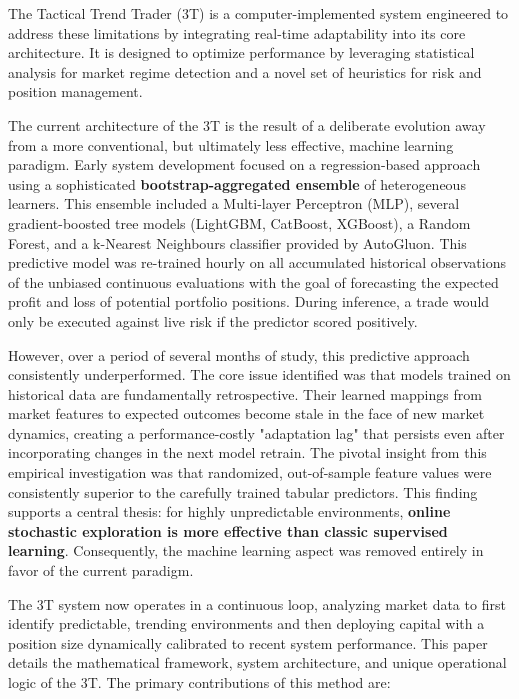 \documentclass[10pt]{article}
\begin{document}
The Tactical Trend Trader (3T) is a computer-implemented system engineered to address these limitations by integrating real-time adaptability into its core architecture. It is designed to optimize performance by leveraging statistical analysis for market regime detection and a novel set of heuristics for risk and position management.

The current architecture of the 3T is the result of a deliberate evolution away from a more conventional, but ultimately less effective, machine learning paradigm. Early system development focused on a regression-based approach using a sophisticated \textbf{bootstrap-aggregated ensemble} of heterogeneous learners. This ensemble included a Multi-layer Perceptron (MLP), several gradient-boosted tree models (LightGBM, CatBoost, XGBoost), a Random Forest, and a k-Nearest Neighbours classifier \cite{ref:bagging, ref:xgboost, ref:lightgbm, ref:catboost} provided by AutoGluon\cite{ref:autogluon}. This predictive model was re-trained hourly on all accumulated historical observations of the unbiased continuous evaluations with the goal of forecasting the expected profit and loss of potential portfolio positions. During inference, a trade would only be executed against live risk if the predictor scored positively.

However, over a period of several months of study, this predictive approach consistently underperformed. The core issue identified was that models trained on historical data are fundamentally retrospective. Their learned mappings from market features to expected outcomes become stale in the face of new market dynamics, creating a performance-costly "adaptation lag" that persists even after incorporating changes in the next model retrain. The pivotal insight from this empirical investigation was that randomized, out-of-sample feature values were consistently superior to the carefully trained tabular predictors. This finding supports a central thesis: for highly unpredictable environments, \textbf{online stochastic exploration is more effective than classic supervised learning}. Consequently, the machine learning aspect was removed entirely in favor of the current paradigm.

The 3T system now operates in a continuous loop, analyzing market data to first identify predictable, trending environments and then deploying capital with a position size dynamically calibrated to recent system performance. This paper details the mathematical framework, system architecture, and unique operational logic of the 3T. The primary contributions of this method are:
\end{document}
